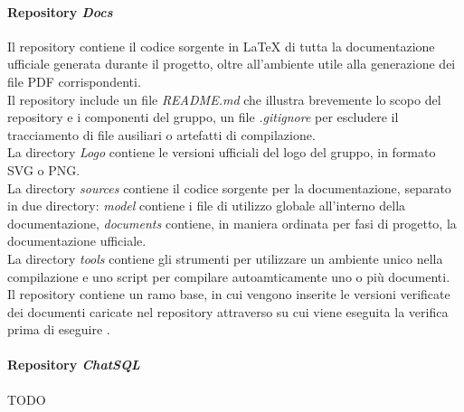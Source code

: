 \paragraph{Repository \emph{Docs}}
Il repository contiene il codice sorgente in LaTeX di tutta la documentazione ufficiale generata durante il progetto, oltre all'ambiente utile alla generazione dei file PDF corrispondenti.\\
Il repository include un file \emph{README.md} che illustra brevemente lo scopo del repository e i componenti del gruppo, un file \emph{.gitignore} per escludere il tracciamento di file ausiliari o artefatti di compilazione.\\
La directory \emph{Logo} contiene le versioni ufficiali del logo del gruppo, in formato SVG o PNG.\\
La directory \emph{sources} contiene il codice sorgente per la documentazione, separato in due directory: \emph{model} contiene i file di utilizzo globale all'interno della documentazione, \emph{documents} contiene, in maniera ordinata per fasi di progetto, la documentazione ufficiale.\\
La directory \emph{tools} contiene gli strumenti  per utilizzare un ambiente unico nella compilazione e uno script per compilare autoamticamente uno o più documenti.\\
\bigskip
Il repository contiene un ramo base, in cui vengono inserite le versioni verificate dei documenti caricate nel repository attraverso  su cui viene eseguita la verifica prima di eseguire .


\paragraph{Repository \emph{ChatSQL}}
TODO